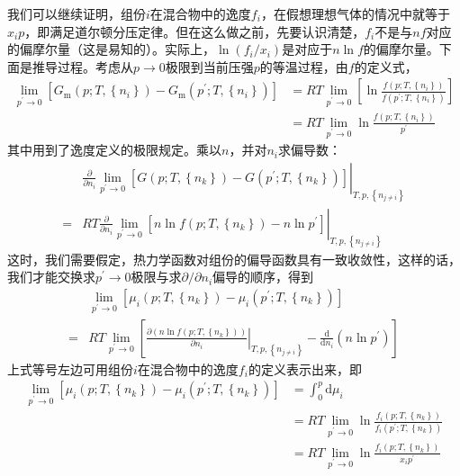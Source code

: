 \documentclass[main.tex]{subfiles}
\begin{document}
我们可以继续证明，组份$i$在混合物中的逸度$f_i$，在假想理想气体的情况中就等于$x_i p$，即满足道尔顿分压定律。但在这么做之前，先要认识清楚，$f_i$不是与$nf$对应的偏摩尔量（这是易知的）。实际上，$\ln\left(f_i/x_i\right)$是对应于$n\ln f$的偏摩尔量。下面是推导过程。考虑从$p\rightarrow 0$极限到当前压强$p$的等温过程，由$f$的定义式，
\begin{align*}
    \lim_{p^\prime\to 0}\left[G_\text{m}\left(p;T,\left\{n_i\right\}\right)-G_\text{m}\left(p^\prime;T,\left\{n_i\right\}\right)\right] & =RT\lim_{p^\prime\to 0}\left[\ln\frac{f\left(p;T,\left\{n_i\right\}\right)}{f\left(p^\prime;T,\left\{n_i\right\}\right)}\right] \\
                                                                                                                                        & =RT\lim_{p^\prime\to 0}\ln\frac{f\left(p;T,\left\{n_i\right\}\right)}{p^\prime}
\end{align*}
其中用到了逸度定义的极限规定。乘以$n$，并对$n_i$求偏导数：
\begin{align*}
      & \left.\frac{\partial}{\partial n_i}\lim_{p^\prime\to 0}\left[G\left(p;T,\left\{n_k\right\}\right)-G\left(p^\prime;T,\left\{n_k\right\}\right)\right]\right|_{T,p,\left\{n_{j\neq i}\right\}} \\
    = & RT\left.\frac{\partial}{\partial n_i}\lim_{p^\prime\to 0}\left[n\ln f\left(p;T,\left\{n_k\right\}\right)-n\ln p^\prime\right]\right|_{T,p,\left\{n_{j\neq i}\right\}}
\end{align*}
这时，我们需要假定，热力学函数对组份的偏导函数具有一致收敛性，这样的话，我们才能交换求$p^\prime\rightarrow 0$极限与求$\partial/\partial n_i$偏导的顺序，得到
\begin{align*}
      & \lim_{p^\prime\to 0}\left[\mu_i\left(p;T,\left\{n_k\right\}\right)-\mu_i\left(p^\prime;T,\left\{n_k\right\}\right)\right]                                                                                                       \\
    = & RT\lim_{p^\prime\to 0}\left[\left.\frac{\partial\left(n\ln f\left(p;T,\left\{n_k\right\}\right)\right)}{\partial n_i}\right|_{T,p,\left\{n_{j\neq i}\right\}}-\frac{\mathrm{d}}{\mathrm{d}n_i}\left(n\ln p^\prime\right)\right]
\end{align*}
上式等号左边可用组份$i$在混合物中的逸度$f_i$的定义表示出来，即
\begin{align*}
    \lim_{p^\prime\to 0}\left[\mu_i\left(p;T,\left\{n_k\right\}\right)-\mu_i\left(p^\prime;T,\left\{n_k\right\}\right)\right] & =\int_0^p\mathrm{d}\mu_i                                                                                               \\
                                                                                                                              & =RT\lim_{p^\prime\to 0}\ln\frac{f_i\left(p;T,\left\{n_k\right\}\right)}{f_i\left(p^\prime;T,\left\{n_k\right\}\right)} \\
                                                                                                                              & =RT\lim_{p^\prime\to 0}\ln\frac{f_i\left(p;T,\left\{n_k\right\}\right)}{x_ip^\prime}
\end{align*}
\end{document}
